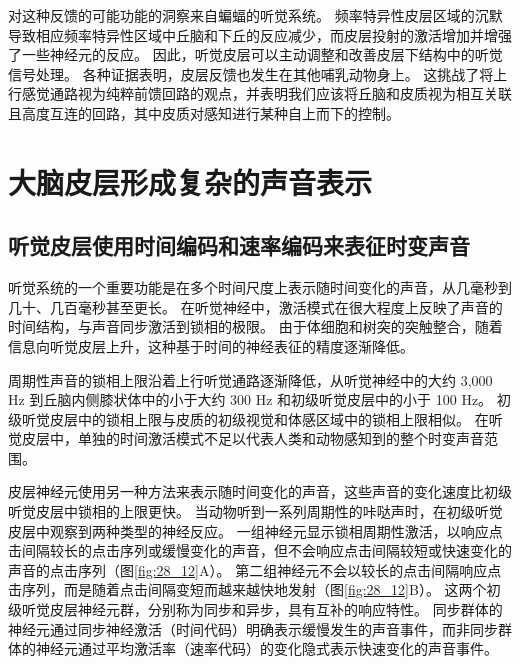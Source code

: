 对这种反馈的可能功能的洞察来自蝙蝠的听觉系统。 
频率特异性皮层区域的沉默导致相应频率特异性区域中丘脑和下丘的反应减少，而皮层投射的激活增加并增强了一些神经元的反应。
因此，听觉皮层可以主动调整和改善皮层下结构中的听觉信号处理。 
各种证据表明，皮层反馈也发生在其他哺乳动物身上。 
这挑战了将上行感觉通路视为纯粹前馈回路的观点，并表明我们应该将丘脑和皮质视为相互关联且高度互连的回路，其中皮质对感知进行某种自上而下的控制。



\section{大脑皮层形成复杂的声音表示}


\subsection{听觉皮层使用时间编码和速率编码来表征时变声音}

听觉系统的一个重要功能是在多个时间尺度上表示随时间变化的声音，从几毫秒到几十、几百毫秒甚至更长。 
在听觉神经中，激活模式在很大程度上反映了声音的时间结构，与声音同步激活到锁相的极限。 
由于体细胞和树突的突触整合，随着信息向听觉皮层上升，这种基于时间的神经表征的精度逐渐降低。


周期性声音的锁相上限沿着上行听觉通路逐渐降低，从听觉神经中的大约 3,000 Hz 到丘脑内侧膝状体中的小于大约 300 Hz 和初级听觉皮层中的小于 100 Hz。 
初级听觉皮层中的锁相上限与皮质的初级视觉和体感区域中的锁相上限相似。 
在听觉皮层中，单独的时间激活模式不足以代表人类和动物感知到的整个时变声音范围。


皮层神经元使用另一种方法来表示随时间变化的声音，这些声音的变化速度比初级听觉皮层中锁相的上限更快。 
当动物听到一系列周期性的咔哒声时，在初级听觉皮层中观察到两种类型的神经反应。 
一组神经元显示锁相周期性激活，以响应点击间隔较长的点击序列或缓慢变化的声音，但不会响应点击间隔较短或快速变化的声音的点击序列（图\ref{fig:28_12}A）。 
第二组神经元不会以较长的点击间隔响应点击序列，而是随着点击间隔变短而越来越快地发射（图\ref{fig:28_12}B）。 
这两个初级听觉皮层神经元群，分别称为同步和异步，具有互补的响应特性。 
同步群体的神经元通过同步神经激活（时间代码）明确表示缓慢发生的声音事件，而非同步群体的神经元通过平均激活率（速率代码）的变化隐式表示快速变化的声音事件。


